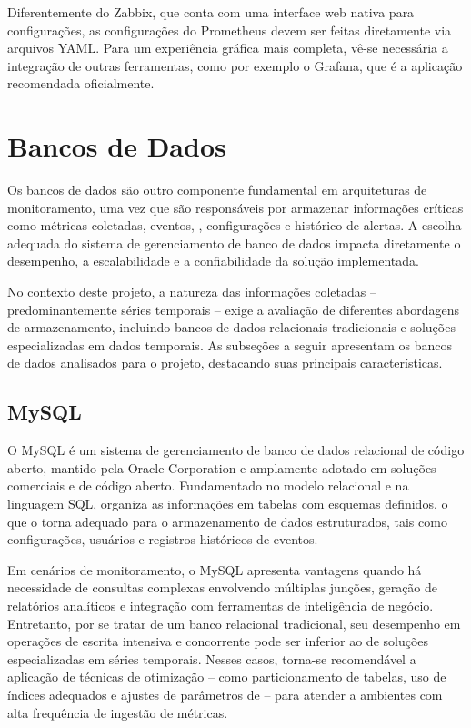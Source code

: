 Diferentemente do Zabbix, que conta com uma interface web nativa para configurações, as configurações do Prometheus devem ser feitas diretamente via arquivos YAML. Para um experiência gráfica mais completa, vê-se necessária a integração de outras ferramentas, como por exemplo o Grafana, que é a aplicação recomendada oficialmente.

\section{Bancos de Dados}
\label{section:BancosDados}

Os bancos de dados são outro componente fundamental em arquiteturas de monitoramento, uma vez que são responsáveis por armazenar informações críticas como métricas coletadas, eventos, , configurações e histórico de alertas. A escolha adequada do sistema de gerenciamento de banco de dados impacta diretamente o desempenho, a escalabilidade e a confiabilidade da solução implementada.

No contexto deste projeto, a natureza das informações coletadas -- predominantemente séries temporais -- exige a avaliação de diferentes abordagens de armazenamento, incluindo bancos de dados relacionais tradicionais e soluções especializadas em dados temporais. As subseções a seguir apresentam os bancos de dados analisados para o projeto, destacando suas principais características.

\subsection{MySQL}
\label{subsection:MySQL}

O MySQL \citep{mysql2025} é um sistema de gerenciamento de banco de dados relacional de código aberto, mantido pela Oracle Corporation e amplamente adotado em soluções comerciais e de código aberto. Fundamentado no modelo relacional e na linguagem SQL, organiza as informações em tabelas com esquemas definidos, o que o torna adequado para o armazenamento de dados estruturados, tais como configurações, usuários e registros históricos de eventos.

Em cenários de monitoramento, o MySQL apresenta vantagens quando há necessidade de consultas complexas envolvendo múltiplas junções, geração de relatórios analíticos e integração com ferramentas de inteligência de negócio. Entretanto, por se tratar de um banco relacional tradicional, seu desempenho em operações de escrita intensiva e concorrente pode ser inferior ao de soluções especializadas em séries temporais. Nesses casos, torna-se recomendável a aplicação de técnicas de otimização -- como particionamento de tabelas, uso de índices adequados e ajustes de parâmetros de  -- para atender a ambientes com alta frequência de ingestão de métricas.

